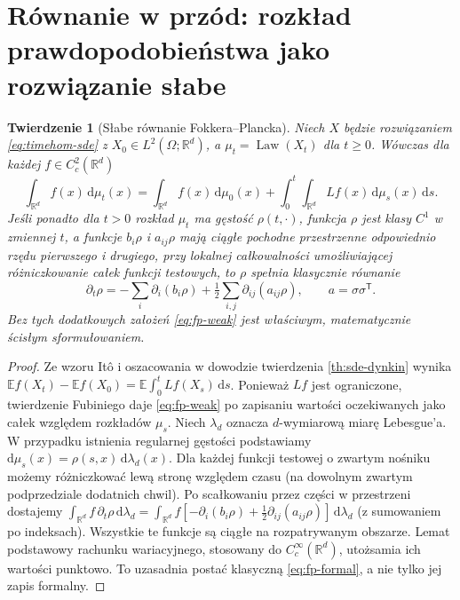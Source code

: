 \documentclass[11pt,a4paper,oneside]{report}
\numberwithin{equation}{chapter}
\theoremstyle{plain}
\newtheorem{twierdzenie}{Twierdzenie}[chapter]
\theoremstyle{definition}
\theoremstyle{remark}
\newcommand{\R}{\mathbb{R}}
\newcommand{\E}{\mathbb{E}}
\newcommand{\Law}{\operatorname{Law}}
\newcommand{\dd}{\mathrm{d}}
\begin{document}
\section{Równanie w przód: rozkład prawdopodobieństwa jako rozwiązanie słabe}\label{sec:volIII:06:04}
\begin{twierdzenie}[Słabe równanie Fokkera--Plancka]\label{thm:volIII:06:04}
\label{th:sde-fp}
Niech $X$ będzie rozwiązaniem \eqref{eq:timehom-sde}
z $X_0\in L^2(\Omega;\R^d)$, a
$\mu_t=\Law(X_t)$ dla $t\ge0$. Wówczas dla każdej
$f\in C_c^2(\R^d)$
\[
\int_{\R^d}f(x)\,\dd\mu_t(x)
=\int_{\R^d}f(x)\,\dd\mu_0(x)
+\int_0^t\int_{\R^d}Lf(x)\,\dd\mu_s(x)\,\dd s.
\tag{6.9}\label{eq:fp-weak}
\]
Jeśli ponadto dla $t>0$ rozkład $\mu_t$ ma gęstość
$\rho(t,\cdot)$, funkcja $\rho$ jest klasy $C^1$
w zmiennej $t$, a funkcje $b_i\rho$ i $a_{ij}\rho$
mają ciągłe pochodne przestrzenne odpowiednio rzędu
pierwszego i drugiego, przy lokalnej całkowalności
umożliwiającej różniczkowanie całek funkcji testowych,
to $\rho$ spełnia klasycznie równanie
\[
\partial_t\rho
=-\sum_i\partial_i(b_i\rho)
+\tfrac12\sum_{i,j}\partial_{ij}(a_{ij}\rho),
\qquad a=\sigma\sigma^{\mathsf T}.
\tag{6.10}\label{eq:fp-formal}
\]
Bez tych dodatkowych założeń \eqref{eq:fp-weak}
jest właściwym, matematycznie ścisłym sformułowaniem.
\end{twierdzenie}
\begin{proof}
Ze wzoru Itô i oszacowania w dowodzie twierdzenia
\ref{th:sde-dynkin} wynika
$\E f(X_t)-\E f(X_0)=\E\int_0^t Lf(X_s)\,\dd s$.
Ponieważ $Lf$ jest ograniczone, twierdzenie Fubiniego
daje \eqref{eq:fp-weak} po zapisaniu wartości
oczekiwanych jako całek względem rozkładów $\mu_s$.
Niech $\lambda_d$ oznacza $d$-wymiarową miarę Lebesgue'a.
W przypadku istnienia regularnej gęstości podstawiamy
$\dd\mu_s(x)=\rho(s,x)\,\dd\lambda_d(x)$.
Dla każdej funkcji testowej o zwartym nośniku możemy
różniczkować lewą stronę względem czasu (na dowolnym
zwartym podprzedziale dodatnich chwil). Po scałkowaniu
przez części w przestrzeni dostajemy
$\int_{\R^d} f\,\partial_t\rho\,\dd\lambda_d
=\int_{\R^d} f[-\partial_i(b_i\rho)+\frac12\partial_{ij}(a_{ij}\rho)]
\,\dd\lambda_d$ (z sumowaniem po indeksach).
Wszystkie te funkcje są ciągłe na rozpatrywanym obszarze.
Lemat podstawowy rachunku wariacyjnego, stosowany do
$C_c^\infty(\R^d)$, utożsamia ich wartości punktowo.
To uzasadnia postać klasyczną \eqref{eq:fp-formal},
a nie tylko jej zapis formalny.
\end{proof}
\end{document}
